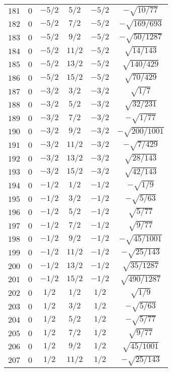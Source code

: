 \begin{table}
\begin{center}
\begin{tabular}{|c|c|c|c|c|c|}
$181$ & $0$ & $-5/2$ & $5/2$ & $-5/2$ & $-\sqrt{10/77}$ \\ 
$182$ & $0$ & $-5/2$ & $7/2$ & $-5/2$ & $-\sqrt{169/693}$ \\ 
$183$ & $0$ & $-5/2$ & $9/2$ & $-5/2$ & $-\sqrt{50/1287}$ \\ 
$184$ & $0$ & $-5/2$ & $11/2$ & $-5/2$ & $\sqrt{14/143}$ \\ 
$185$ & $0$ & $-5/2$ & $13/2$ & $-5/2$ & $\sqrt{140/429}$ \\ 
$186$ & $0$ & $-5/2$ & $15/2$ & $-5/2$ & $\sqrt{70/429}$ \\ 
$187$ & $0$ & $-3/2$ & $3/2$ & $-3/2$ & $\sqrt{1/7}$ \\ 
$188$ & $0$ & $-3/2$ & $5/2$ & $-3/2$ & $\sqrt{32/231}$ \\ 
$189$ & $0$ & $-3/2$ & $7/2$ & $-3/2$ & $-\sqrt{1/77}$ \\ 
$190$ & $0$ & $-3/2$ & $9/2$ & $-3/2$ & $-\sqrt{200/1001}$ \\ 
$191$ & $0$ & $-3/2$ & $11/2$ & $-3/2$ & $-\sqrt{7/429}$ \\ 
$192$ & $0$ & $-3/2$ & $13/2$ & $-3/2$ & $\sqrt{28/143}$ \\ 
$193$ & $0$ & $-3/2$ & $15/2$ & $-3/2$ & $\sqrt{42/143}$ \\ 
$194$ & $0$ & $-1/2$ & $1/2$ & $-1/2$ & $-\sqrt{1/9}$ \\ 
$195$ & $0$ & $-1/2$ & $3/2$ & $-1/2$ & $-\sqrt{5/63}$ \\ 
$196$ & $0$ & $-1/2$ & $5/2$ & $-1/2$ & $\sqrt{5/77}$ \\ 
$197$ & $0$ & $-1/2$ & $7/2$ & $-1/2$ & $\sqrt{9/77}$ \\ 
$198$ & $0$ & $-1/2$ & $9/2$ & $-1/2$ & $-\sqrt{45/1001}$ \\ 
$199$ & $0$ & $-1/2$ & $11/2$ & $-1/2$ & $-\sqrt{25/143}$ \\ 
$200$ & $0$ & $-1/2$ & $13/2$ & $-1/2$ & $\sqrt{35/1287}$ \\ 
$201$ & $0$ & $-1/2$ & $15/2$ & $-1/2$ & $\sqrt{490/1287}$ \\ 
$202$ & $0$ & $1/2$ & $1/2$ & $1/2$ & $\sqrt{1/9}$ \\ 
$203$ & $0$ & $1/2$ & $3/2$ & $1/2$ & $-\sqrt{5/63}$ \\ 
$204$ & $0$ & $1/2$ & $5/2$ & $1/2$ & $-\sqrt{5/77}$ \\ 
$205$ & $0$ & $1/2$ & $7/2$ & $1/2$ & $\sqrt{9/77}$ \\ 
$206$ & $0$ & $1/2$ & $9/2$ & $1/2$ & $\sqrt{45/1001}$ \\ 
$207$ & $0$ & $1/2$ & $11/2$ & $1/2$ & $-\sqrt{25/143}$ \\ 

\end{tabular}
\end{center}
\end{table}
